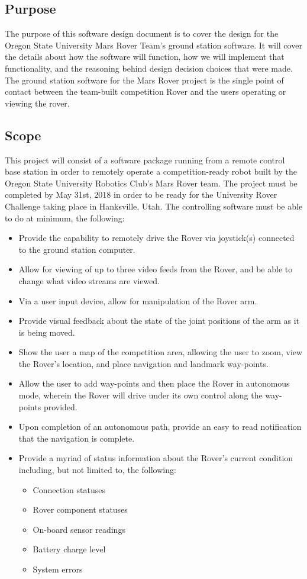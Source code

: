 \subsection{Purpose}
The purpose of this software design document is to cover the design for the Oregon State University Mars Rover Team's ground station software.
It will cover the details about how the software will function, how we will implement that functionality, and the reasoning behind design decision choices that were made.
The ground station software for the Mars Rover project is the single point of contact between the team-built competition Rover and the users operating or viewing the rover.


\subsection{Scope}
This project will consist of a software package running from a remote control base station in order to remotely operate a competition-ready robot built by the Oregon State University Robotics Club's Mars Rover team.
The project must be completed by May 31st, 2018 in order to be ready for the University Rover Challenge taking place in Hanksville, Utah.
The controlling software must be able to do at minimum, the following: 

\begin{itemize}
\item Provide the capability to remotely drive the Rover via joystick(s) connected to the ground station computer.
\item Allow for viewing of up to three video feeds from the Rover, and be able to change what video streams are viewed.
\item Via a user input device, allow for manipulation of the Rover arm.
\item Provide visual feedback about the state of the joint positions of the arm as it is being moved.
\item Show the user a map of the competition area, allowing the user to zoom, view the Rover's location, and place navigation and landmark way-points.
\item Allow the user to add way-points and then place the Rover in autonomous mode, wherein the Rover will drive under its own control along the way-points provided.
\item Upon completion of an autonomous path, provide an easy to read notification that the navigation is complete.
\item Provide a myriad of status information about the Rover's current condition including, but not limited to, the following:
  \begin{itemize}
  \item Connection statuses
  \item Rover component statuses
  \item On-board sensor readings
  \item Battery charge level
  \item System errors
  \end{itemize}
\end{itemize}

